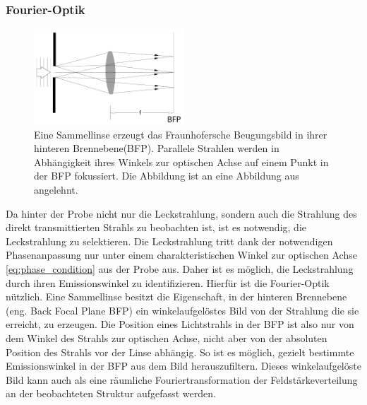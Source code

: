 \documentclass[titlepage]{article}
\begin{document}
	\subsubsection{Fourier-Optik}
	\label{sec:fourier}
	\begin{figure}[htbp] 
		\centering
		\includegraphics[width=0.5\textwidth]{figures/FourierLinse.pdf}
		\caption[Fourieroptik]{Eine Sammellinse erzeugt das Fraunhofersche Beugungsbild in ihrer hinteren Brennebene(BFP). Parallele Strahlen werden in Abhängigkeit ihres Winkels zur optischen Achse auf einem Punkt in der BFP fokussiert. Die Abbildung ist an eine Abbildung aus \cite{Hecht.2018} angelehnt.}
		\label{fig:FourierLinse}
	\end{figure}
	Da hinter der Probe nicht nur die Leckstrahlung, sondern auch die Strahlung des direkt transmittierten Strahls zu beobachten ist, ist es notwendig, die Leckstrahlung zu selektieren. Die Leckstrahlung tritt dank der notwendigen Phasenanpassung nur unter einem charakteristischen Winkel zur optischen Achse \eqref{eq:phase_condition} aus der Probe aus. Daher ist es möglich, die Leckstrahlung durch ihren Emissionswinkel zu identifizieren. Hierfür ist die Fourier-Optik nützlich. Eine Sammellinse besitzt die Eigenschaft, in  der hinteren Brennebene (eng. Back Focal Plane BFP) ein winkelaufgelöstes Bild von der Strahlung die sie erreicht, zu erzeugen\cite{Hecht.1996}. Die Position eines Lichtstrahls in der BFP ist also nur von dem Winkel des Strahls zur optischen Achse, nicht aber von der absoluten Position des Strahls vor der Linse abhängig. So ist es möglich, gezielt bestimmte Emissionswinkel in der BFP aus dem Bild herauszufiltern. Dieses winkelaufgelöste Bild kann auch als eine räumliche Fouriertransformation der Feldstärkeverteilung an der beobachteten Struktur aufgefasst werden. 
	
\end{document}
